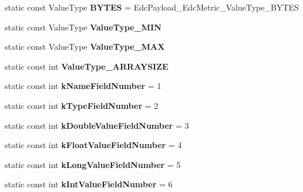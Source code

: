 \begin{DoxyCompactItemize}
\item 
\hypertarget{classedcdatatypes_1_1_edc_payload___edc_metric_a41e02c7d9670ec56201c3ca0c8ddfe94}{static const Value\-Type {\bfseries B\-Y\-T\-E\-S} = Edc\-Payload\-\_\-\-Edc\-Metric\-\_\-\-Value\-Type\-\_\-\-B\-Y\-T\-E\-S}\label{classedcdatatypes_1_1_edc_payload___edc_metric_a41e02c7d9670ec56201c3ca0c8ddfe94}

\item 
static const Value\-Type {\bfseries Value\-Type\-\_\-\-M\-I\-N}
\item 
static const Value\-Type {\bfseries Value\-Type\-\_\-\-M\-A\-X}
\item 
static const int {\bfseries Value\-Type\-\_\-\-A\-R\-R\-A\-Y\-S\-I\-Z\-E}
\item 
\hypertarget{classedcdatatypes_1_1_edc_payload___edc_metric_a1195c377763417cba9aac7095156020e}{static const int {\bfseries k\-Name\-Field\-Number} = 1}\label{classedcdatatypes_1_1_edc_payload___edc_metric_a1195c377763417cba9aac7095156020e}

\item 
\hypertarget{classedcdatatypes_1_1_edc_payload___edc_metric_a395c4d1d58758114c9e870d41e6cfa76}{static const int {\bfseries k\-Type\-Field\-Number} = 2}\label{classedcdatatypes_1_1_edc_payload___edc_metric_a395c4d1d58758114c9e870d41e6cfa76}

\item 
\hypertarget{classedcdatatypes_1_1_edc_payload___edc_metric_abf1519a15580cbe3865e9c2b4efde562}{static const int {\bfseries k\-Double\-Value\-Field\-Number} = 3}\label{classedcdatatypes_1_1_edc_payload___edc_metric_abf1519a15580cbe3865e9c2b4efde562}

\item 
\hypertarget{classedcdatatypes_1_1_edc_payload___edc_metric_a268460706b2fa388e4e40ee6e69e3997}{static const int {\bfseries k\-Float\-Value\-Field\-Number} = 4}\label{classedcdatatypes_1_1_edc_payload___edc_metric_a268460706b2fa388e4e40ee6e69e3997}

\item 
\hypertarget{classedcdatatypes_1_1_edc_payload___edc_metric_aca8100095177d496ebd491c5bbddd0d2}{static const int {\bfseries k\-Long\-Value\-Field\-Number} = 5}\label{classedcdatatypes_1_1_edc_payload___edc_metric_aca8100095177d496ebd491c5bbddd0d2}

\item 
\hypertarget{classedcdatatypes_1_1_edc_payload___edc_metric_a6c18dacfd2f63c1971f65286bb0930dd}{static const int {\bfseries k\-Int\-Value\-Field\-Number} = 6}\label{classedcdatatypes_1_1_edc_payload___edc_metric_a6c18dacfd2f63c1971f65286bb0930dd}


\end{DoxyCompactItemize}
